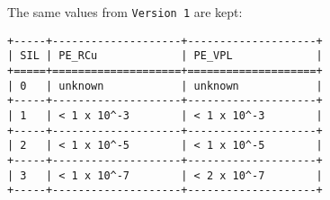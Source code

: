 The same values from \texttt{Version\ 1} are kept:

\begin{verbatim}
+-----+--------------------+--------------------+
| SIL | PE_RCu             | PE_VPL             |
+=====+====================+====================+
| 0   | unknown            | unknown            |
+-----+--------------------+--------------------+
| 1   | < 1 x 10^-3        | < 1 x 10^-3        |
+-----+--------------------+--------------------+
| 2   | < 1 x 10^-5        | < 1 x 10^-5        |
+-----+--------------------+--------------------+
| 3   | < 1 x 10^-7        | < 2 x 10^-7        |
+-----+--------------------+--------------------+
\end{verbatim}
